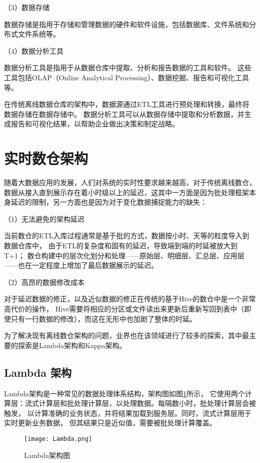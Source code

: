 （3）数据存储

数据存储是指用于存储和管理数据的硬件和软件设施，包括数据库、文件系统和分布式文件系统等。

（4）数据分析工具

数据分析工具是指用于从数据仓库中提取、分析和报告数据的工具和软件。
这些工具包括OLAP（Online Analytical Processing）、数据挖掘、报告和可视化工具等。

在传统离线数据仓库的架构中，数据源通过ETL工具进行预处理和转换，最终将数据存储在数据存储中。
数据分析工具可以从数据存储中提取和分析数据，并生成报告和可视化结果，以帮助企业做出决策和制定战略。

\section{实时数仓架构}

随着大数据应用的发展，人们对系统的实时性要求越来越高，对于传统离线数仓，
数据从接入直到展示存在着小时级以上的延迟\cite{25}，这其中一方面是因为批处理框架本身延迟的限制，另一方面也是因为对于变化数据捕捉能力的缺失：

（1）无法避免的架构延迟

当前数仓的ETL入库过程通常是基于批的方式，数据按小时、天等的粒度导入到数据仓库中，
由于ETL的复杂度和固有的延迟，导致端到端的时延被放大到T+1；
数仓构建中的层次化划分和处理——原始层、明细层、汇总层、应用层——也在一定程度上增加了最后数据展示的延迟。

（2）高昂的数据修改成本

对于延迟数据的修正，以及近似数据的修正在传统的基于Hive的数仓中是一个非常高代价的操作，
Hive需要将相应的分区或文件读出来更新后重新写回到表中（即使只有一行数据的修改），而这在无形中也加剧了整体的时延。

为了解决现有离线数仓架构的问题，业界也在该领域进行了较多的探索，其中最主要的探索是Lambda架构和Kappa架构。

\subsection{Lambda 架构}

Lambda架构是一种常见的数据处理体系结构，架构图如图\ref{fig:Lambda架构图}所示，
它使用两个计算层：流式计算层和批处理计算层，以处理数据。每隔数小时，批处理计算层会被触发，
以计算准确的业务状态，并将结果加载到服务层。同时，流式计算层用于实时更新业务数据，
但其结果只是近似值，需要被批处理计算覆盖\cite{3}。

\begin{figure}[H]
  \centering
  \texttt{[image: Lambda.png]}
  \caption{Lambda架构图}
  \label{fig:Lambda架构图}
\end{figure}

